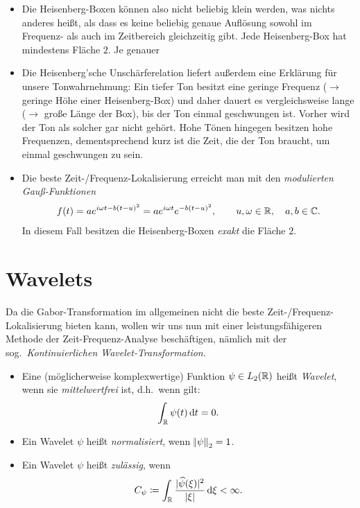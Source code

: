 \begin{remark} \leavevmode
\begin{itemize}
\item Die Heisenberg-Boxen können also nicht beliebig klein werden, was nichts anderes heißt, als
  dass es keine beliebig genaue Auflösung sowohl im Frequenz- als auch im Zeitbereich gleichzeitig
  gibt. Jede Heisenberg-Box hat mindestens Fläche $ 2 $. Je genauer
\item Die Heisenberg'sche Unschärferelation liefert außerdem eine Erklärung für unsere 
  Tonwahrnehmung: Ein tiefer Ton besitzt eine geringe Frequenz ($ \rightarrow $ geringe Höhe 
  einer Heisenberg-Box) und daher dauert es vergleichsweise lange ($ \rightarrow $ große Länge der 
  Box), bis der Ton einmal geschwungen ist. Vorher wird der Ton als solcher gar nicht gehört.
  Hohe Tönen hingegen besitzen hohe Frequenzen, dementsprechend kurz ist die Zeit, die der Ton
  braucht, um einmal geschwungen zu sein.
\item Die beste Zeit-/Frequenz-Lokalisierung erreicht man mit den \emph{modulierten Gauß-Funktionen}
  \[
    f(t) = a e^{i \omega t - b(t-u)^{2}} = a e^{i \omega t} e^{-b(t-u)^{2}},
      \qquad u, \omega \in \mathbb{R}, \quad a,b \in \mathbb{C}.
  \]
  In diesem Fall besitzen die Heisenberg-Boxen \emph{exakt} die Fläche $ 2 $.
\end{itemize}
\end{remark}


\section{Wavelets}

Da die Gabor-Transformation im allgemeinen nicht die beste Zeit-/Frequenz-Lokalisierung bieten kann,
wollen wir uns nun mit einer leistungsfähigeren Methode der Zeit-Frequenz-Analyse beschäftigen,
nämlich mit der sog.\ \emph{Kontinuierlichen Wavelet-Transformation}.

\begin{definition} \leavevmode
\begin{itemize}
\item Eine (möglicherweise komplexwertige) Funktion $ \psi \in L_{2}(\mathbb{R}) $ heißt \emph{Wavelet},
  wenn sie \emph{mittelwertfrei} ist, d.h.\ wenn gilt:
  \[
    \int_{\R} \psi(t) \dif t = 0.
  \]
\item Ein Wavelet $ \psi $ heißt \emph{normalisiert}, wenn $ \norm{\psi}_{2} = 1 $.
\item Ein Wavelet $ \psi $ heißt \emph{zulässig}, wenn
  \[
    C_{\psi} \coloneqq \int_{\R} \frac{|\widehat{\psi}(\xi)|^{2}}{|\xi|} \dif \xi < \infty.
  \]
\end{itemize}
\end{definition}

